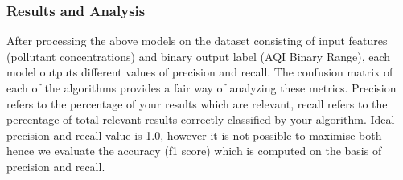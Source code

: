 \documentclass{article}
\begin{document}
\subsubsection  {\color{brown} \textbf{Results and Analysis} } 
\begin{itemize}


After processing the above models on the dataset consisting of input features (pollutant concentrations) and binary output label (AQI Binary Range), each model outputs different values of precision and recall. The confusion matrix of each of the algorithms provides a fair way of analyzing these metrics. Precision refers to the percentage of your results which are relevant, recall refers to the percentage of total relevant results correctly classified by your algorithm. Ideal precision and recall value is 1.0, however it is not possible to maximise both hence we evaluate the accuracy (f1 score) which is computed on the basis of precision and recall. \\ \\
\end{itemize}
\end{document}
